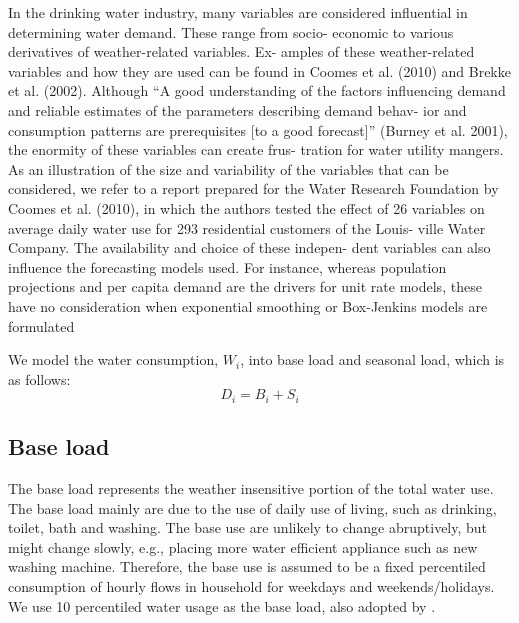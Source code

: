 \documentclass[a4paper,12pt]{llncs}
\newcommand{\eg}{e.g.}
\begin{document}
In the drinking water industry, many variables are considered
influential in determining water demand. These range from socio-
economic to various derivatives of weather-related variables. Ex-
amples of these weather-related variables and how they are used
can be found in Coomes et al. (2010) and Brekke et al. (2002).
Although “A good understanding of the factors influencing demand
and reliable estimates of the parameters describing demand behav-
ior and consumption patterns are prerequisites [to a good forecast]”
(Burney et al. 2001), the enormity of these variables can create frus-
tration for water utility mangers. As an illustration of the size and
variability of the variables that can be considered, we refer to a
report prepared for the Water Research Foundation by Coomes et al.
(2010), in which the authors tested the effect of 26 variables on
average daily water use for 293 residential customers of the Louis-
ville Water Company. The availability and choice of these indepen-
dent variables can also influence the forecasting models used. For
instance, whereas population projections and per capita demand are
the drivers for unit rate models, these have no consideration when
exponential smoothing or Box-Jenkins models are formulated

We model the water consumption, $W_i$, into base load and seasonal load, which is as follows:
\begin{equation}
D_i = B_i + S_i 
\end{equation}

\subsection{Base load}
The base load represents the weather insensitive portion of the total water use. The base load mainly are due to the use of daily use of living, such as drinking, toilet, bath and washing. The base use are unlikely to change abruptively, but might change slowly, \eg, placing more water efficient appliance such as new washing machine.  Therefore, the base use is assumed to be a fixed percentiled consumption of hourly flows in household for weekdays and weekends/holidays. We use 10 percentiled water usage as the base load, also adopted by \cite{zhou2002}.
\end{document}

